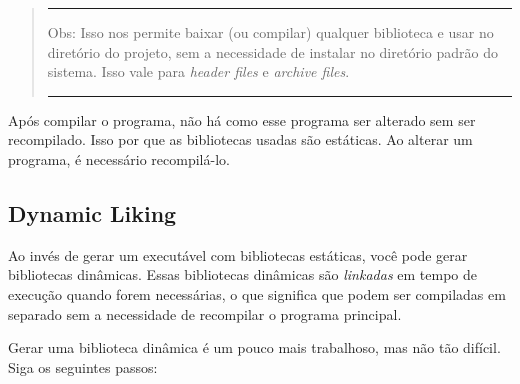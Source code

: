 \documentclass[12pt, a4paper]{article}
\begin{document}
\begin{quote}
\rule{\textwidth}{1pt}
Obs: Isso nos permite baixar (ou compilar) qualquer biblioteca e usar no diretório do projeto, sem a necessidade de instalar no diretório padrão do sistema. Isso vale para \textit{header files} e \textit{archive files}.
\rule{\textwidth}{1pt}
\end{quote}

Após compilar o programa, não há como esse programa ser alterado sem ser recompilado. Isso por que as bibliotecas usadas são estáticas. Ao alterar um programa, é necessário recompilá-lo.

\subsection{Dynamic Liking}

Ao invés de gerar um executável com bibliotecas estáticas, você pode gerar bibliotecas dinâmicas. Essas bibliotecas dinâmicas são \textit{linkadas} em tempo de execução quando forem necessárias, o que significa que podem ser compiladas em separado sem a necessidade de recompilar o programa principal.

Gerar uma biblioteca dinâmica é um pouco mais trabalhoso, mas não tão difícil. Siga os seguintes passos:
\end{document}
